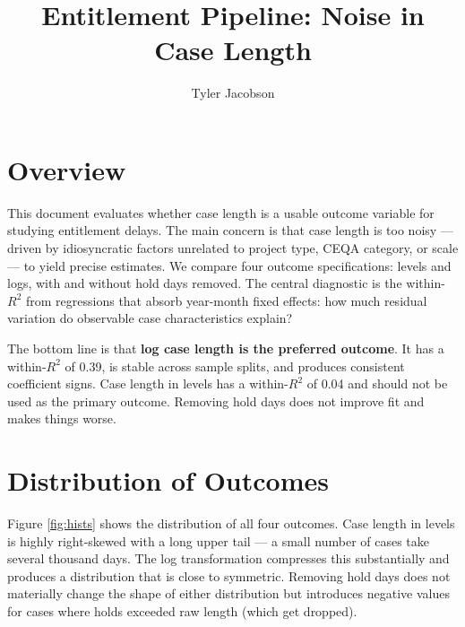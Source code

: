 \documentclass[12pt]{article}
\title{Entitlement Pipeline: Noise in Case Length}
\author{Tyler Jacobson}
\theoremstyle{definition}
\begin{document}
\maketitle

\section*{Overview}

This document evaluates whether case length is a usable outcome variable for studying entitlement delays. The main concern is that case length is too noisy — driven by idiosyncratic factors unrelated to project type, CEQA category, or scale — to yield precise estimates. We compare four outcome specifications: levels and logs, with and without hold days removed. The central diagnostic is the within-$R^2$ from regressions that absorb year-month fixed effects: how much residual variation do observable case characteristics explain?

The bottom line is that \textbf{log case length is the preferred outcome}. It has a within-$R^2$ of 0.39, is stable across sample splits, and produces consistent coefficient signs. Case length in levels has a within-$R^2$ of 0.04 and should not be used as the primary outcome. Removing hold days does not improve fit and makes things worse.

\section{Distribution of Outcomes}

Figure \ref{fig:hists} shows the distribution of all four outcomes. Case length in levels is highly right-skewed with a long upper tail — a small number of cases take several thousand days. The log transformation compresses this substantially and produces a distribution that is close to symmetric. Removing hold days does not materially change the shape of either distribution but introduces negative values for cases where holds exceeded raw length (which get dropped).
\end{document}
